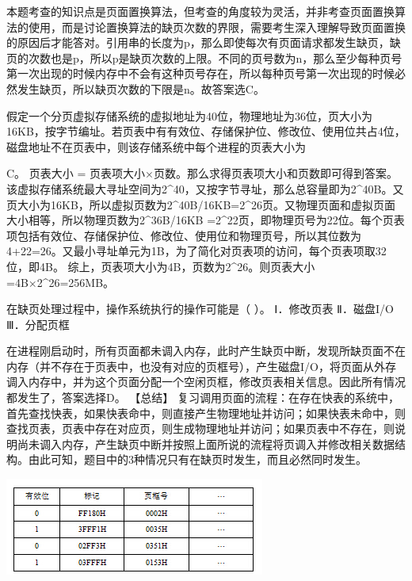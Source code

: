 \begin{solution}本题考查的知识点是页面置换算法，但考查的角度较为灵活，并非考查页面置换算法的使用，而是讨论置换算法的缺页次数的界限，需要考生深入理解导致页面置换的原因后才能答对。引用串的长度为p，那么即使每次有页面请求都发生缺页，缺页的次数也是p，所以p是缺页次数的上限。不同的页号数为n，那么至少每种页号第一次出现的时候内存中不会有这种页号存在，所以每种页号第一次出现的时候必然发生缺页，所以缺页次数的下限是n。故答案选C。
\end{solution}
\question 假定一个分页虚拟存储系统的虚拟地址为40位，物理地址为36位，页大小为16KB，按字节编址。若页表中有有效位、存储保护位、修改位、使用位共占4位，磁盘地址不在页表中，则该存储系统中每个进程的页表大小为
\par{}
\begin{solution}C。 页表大小 = 页表项大小×页数。那么求得页表项大小和页数即可得到答案。
该虚拟存储系统最大寻址空间为2\^{}40，又按字节寻址，那么总容量即为2\^{}40B。又页大小为16KB，所以虚拟页数为2\^{}40B/16KB=2\^{}26页。又物理页面和虚拟页面大小相等，所以物理页数为2\^{}36B/16KB
=2\^{}22页，即物理页号为22位。每个页表项包括有效位、存储保护位、修改位、使用位和物理页号，所以其位数为4+22=26。又最小寻址单元为1B，为了简化对页表项的访问，每个页表项取32位，即4B。
综上，页表项大小为4B，页数为2\^{}26。则页表大小=4B×2\^{}26=256MB。
\end{solution}
\question 在缺页处理过程中，操作系统执行的操作可能是（ ）。 Ⅰ．修改页表 Ⅱ．磁盘I/O
Ⅲ．分配页框
\par{}
\begin{solution}在进程刚启动时，所有页面都未调入内存，此时产生缺页中断，发现所缺页面不在内存（并不存在于页表中，也没有对应的页框号），产生磁盘I/O，将页面从外存调入内存中，并为这个页面分配一个空闲页框，修改页表相关信息。因此所有情况都发生了，答案选择D。
【总结】
复习调用页面的流程：在存在快表的系统中，首先查找快表，如果快表命中，则直接产生物理地址并访问；如果快表未命中，则查找页表，页表中存在对应页，则生成物理地址并访问；如果页表中不存在，则说明尚未调入内存，产生缺页中断并按照上面所说的流程将页调入并修改相关数据结构。由此可知，题目中的3种情况只有在缺页时发生，而且必然同时发生。
\end{solution}
\question \includegraphics[width=3.36458in,height=1.26042in]{computerassets/44e3f2881e7837913afca6cad4646bcb.jpeg}~

